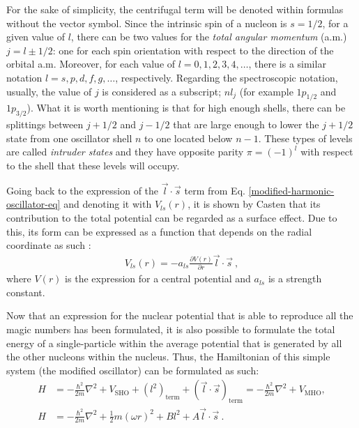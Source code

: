For the sake of simplicity, the centrifugal term will be denoted within formulas without the vector symbol. Since the intrinsic spin of a nucleon is $s=1/2$, for a given value of $l$, there can be two values for the \emph{total angular momentum} (a.m.) $j=l\pm1/2$: one for each spin orientation with respect to the direction of the orbital a.m. Moreover, for each value of $l=0,1,2,3,4,\dots$, there is a similar notation $l=s,p,d,f,g,\dots$, respectively. Regarding the spectroscopic notation, usually, the value of $j$ is considered as a subscript; $nl_j$ (for example $1p_{1/2}$ and $1p_{3/2}$). What it is worth mentioning is that for high enough shells, there can be splittings between $j+1/2$ and $j-1/2$ that are large enough to lower the $j+1/2$ state from one oscillator shell $n$ to one located below $n-1$. These types of levels are called \emph{intruder states} and they have opposite parity $\pi=(-1)^l$ with respect to the shell that these levels will occupy.

Going back to the expression of the $\vec{l}\cdot\vec{s}$ term from Eq. \ref{modified-harmonic-oscillator-eq} and denoting it with $V_{ls}(r)$, it is shown by Casten \cite{casten2000nuclear} that its contribution to the total potential can be regarded as a surface effect. Due to this, its form can be expressed as a function that depends on the radial coordinate as such \cite{casten2000nuclear}:
\begin{align}
    V_{ls}(r)=-a_{ls}\frac{\partial V(r)}{\partial r}\vec{l}\cdot\vec{s}\ ,
\end{align}
where $V(r)$ is the expression for a central potential and $a_{ls}$ is a strength constant.

Now that an expression for the nuclear potential that is able to reproduce all the magic numbers has been formulated, it is also possible to formulate the total energy of a single-particle within the average potential that is generated by all the other nucleons within the nucleus. Thus, the Hamiltonian of this simple system (the modified oscillator) can be formulated as such:
\begin{align}
    H&=-\frac{\hbar^2}{2m}\nabla^2+V_\text{SHO}+(l^2)_\text{term}+(\vec{l}\cdot\vec{s})_\text{term}=-\frac{\hbar^2}{2m}\nabla^2+V_\text{MHO} , \nonumber\\
    H&=-\frac{\hbar^2}{2m}\nabla^2+\frac{1}{2}m(\omega r)^2+Bl^2+A\vec{l}\cdot\vec{s}\ .
\end{align}

